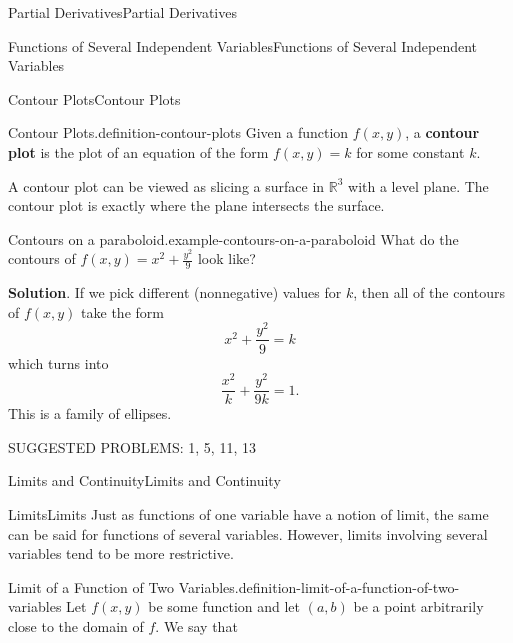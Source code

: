 \documentclass[10pt,]{book}
\newcommand{\terminology}[1]{\textbf{#1}}
\numberwithin{equation}{section}
\newcommand{\RR}{\mathbb{R}}
\begin{document}
\begin{chapterptx}{Partial Derivatives}{}{Partial Derivatives}{}{}
\begin{sectionptx}{Functions of Several Independent Variables}{}{Functions of Several Independent Variables}{}{}
\begin{subsectionptx}{Contour Plots}{}{Contour Plots}{}{}
\begin{definition}{Contour Plots.}{definition-contour-plots}
\hypertarget{p-1118}{}%
Given a function \(f(x,y)\), a \terminology{contour plot} is the plot of an equation of the form \(f(x,y) = k\) for some constant \(k\).%
\end{definition}
\hypertarget{p-1119}{}%
A contour plot can be viewed as slicing a surface in \(\RR^{3}\) with a level plane. The contour plot is exactly where the plane intersects the surface.%
\begin{example}{Contours on a paraboloid.}{example-contours-on-a-paraboloid}%
\hypertarget{p-1120}{}%
What do the contours of \(f(x,y) = x^{2} + \frac{y^{2}}{9}\) look like?%
\par\smallskip%
\noindent\textbf{Solution}.\hypertarget{solution-171}{}\quad%
\hypertarget{p-1121}{}%
If we pick different (nonnegative) values for \(k\), then all of the contours of \(f(x,y)\) take the form%
\begin{equation*}
x^{2} + \frac{y^{2}}{9} = k
\end{equation*}
which turns into%
\begin{equation*}
\frac{x^{2}}{k} + \frac{y^{2}}{{9k}} = 1.
\end{equation*}
This is a family of ellipses.%
\end{example}
\end{subsectionptx}
\hypertarget{p-1122}{}%
SUGGESTED PROBLEMS: 1, 5, 11, 13%
\end{sectionptx}
%
%
\typeout{************************************************}
\typeout{************************************************}
%
\begin{sectionptx}{Limits and Continuity}{}{Limits and Continuity}{}{}\label{section-limits-and-continuity}
%
%
\typeout{************************************************}
\typeout{************************************************}
%
\begin{subsectionptx}{Limits}{}{Limits}{}{}\label{subsection-limits}
\hypertarget{p-1123}{}%
Just as functions of one variable have a notion of limit, the same can be said for functions of several variables. However, limits involving several variables tend to be more restrictive.%
\begin{definition}{Limit of a Function of Two Variables.}{definition-limit-of-a-function-of-two-variables}%
\hypertarget{p-1124}{}%
Let \(f(x,y)\) be some function and let \((a,b)\) be a point arbitrarily close to the domain of \(f\). We say that%

\end{definition}
\end{subsectionptx}
\end{sectionptx}
\end{chapterptx}
\end{document}

